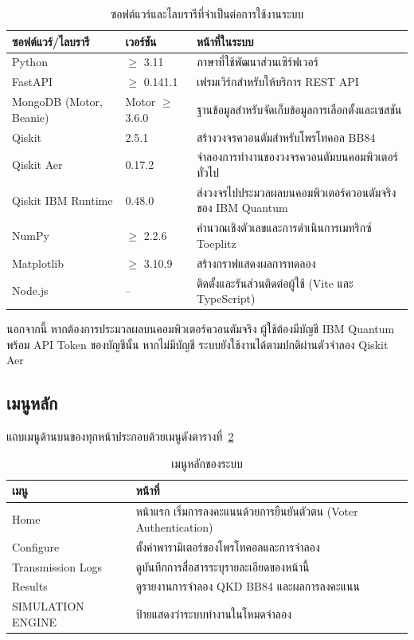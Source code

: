 \begin{table}[htbp]
\centering
\begin{tabular}{|l|l|p{7.5cm}|}
\hline
\textbf{ซอฟต์แวร์/ไลบรารี} & \textbf{เวอร์ชัน} & \textbf{หน้าที่ในระบบ} \\ \hline
Python & $\ge$ 3.11 & ภาษาที่ใช้พัฒนาส่วนเซิร์ฟเวอร์ \\ \hline
FastAPI & $\ge$ 0.141.1 & เฟรมเวิร์กสำหรับให้บริการ REST API \\ \hline
MongoDB (Motor, Beanie) & Motor $\ge$ 3.6.0 & ฐานข้อมูลสำหรับจัดเก็บข้อมูลการเลือกตั้งและเซสชัน \\ \hline
Qiskit & 2.5.1 & สร้างวงจรควอนตัมสำหรับโพรโทคอล BB84 \\ \hline
Qiskit Aer & 0.17.2 & จำลองการทำงานของวงจรควอนตัมบนคอมพิวเตอร์ทั่วไป \\ \hline
Qiskit IBM Runtime & 0.48.0 & ส่งวงจรไปประมวลผลบนคอมพิวเตอร์ควอนตัมจริงของ IBM Quantum \\ \hline
NumPy & $\ge$ 2.2.6 & คำนวณเชิงตัวเลขและการดำเนินการเมทริกซ์ Toeplitz \\ \hline
Matplotlib & $\ge$ 3.10.9 & สร้างกราฟแสดงผลการทดลอง \\ \hline
Node.js & -- & ติดตั้งและรันส่วนติดต่อผู้ใช้ (Vite และ TypeScript) \\ \hline
\end{tabular}
\caption{ซอฟต์แวร์และไลบรารีที่จำเป็นต่อการใช้งานระบบ}
\label{tab:manual-requirements}
\end{table}

นอกจากนี้ หากต้องการประมวลผลบนคอมพิวเตอร์ควอนตัมจริง ผู้ใช้ต้องมีบัญชี IBM Quantum
พร้อม API Token ของบัญชีนั้น หากไม่มีบัญชี ระบบยังใช้งานได้ตามปกติผ่านตัวจำลอง Qiskit Aer

\subsection{เมนูหลัก}
แถบเมนูด้านบนของทุกหน้าประกอบด้วยเมนูดังตารางที่~\ref{tab:manual-menu}

\begin{table}[htbp]
\centering
\begin{tabular}{|l|p{9cm}|}
\hline
\textbf{เมนู} & \textbf{หน้าที่} \\ \hline
Home & หน้าแรก เริ่มการลงคะแนนด้วยการยืนยันตัวตน (Voter Authentication) \\ \hline
Configure & ตั้งค่าพารามิเตอร์ของโพรโทคอลและการจำลอง \\ \hline
Transmission Logs & ดูบันทึกการสื่อสาร{ระบุรายละเอียดของหน้านี้} \\ \hline
Results & ดูรายงานการจำลอง QKD BB84 และผลการลงคะแนน \\ \hline
SIMULATION ENGINE & ป้ายแสดงว่าระบบทำงานในโหมดจำลอง \\ \hline
\end{tabular}
\caption{เมนูหลักของระบบ}
\label{tab:manual-menu}
\end{table}


